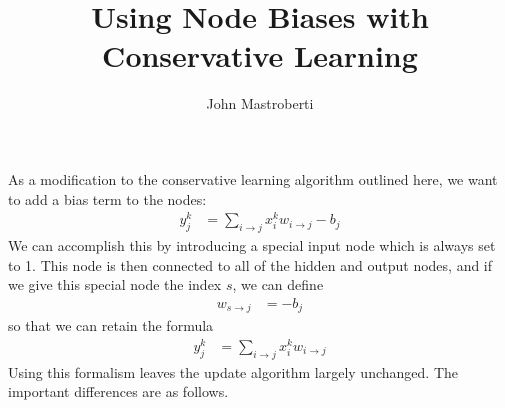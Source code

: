 \documentclass[12pt]{article}
\begin{document}
\title{Using Node Biases with Conservative Learning}
\author{John Mastroberti}
 
\maketitle

As a modification to the conservative learning algorithm outlined here\cite{cl_update}, we want to add a bias term to the nodes:
\begin{align}
y_j^k & = \sum_{i \rightarrow j} x_i^k w_{i \rightarrow j} - b_j
\end{align}
We can accomplish this by introducing a special input node which is always set to 1.
This node is then connected to all of the hidden and output nodes, 
and if we give this special node the index $s$, we can define
\begin{align}
w_{s \rightarrow j} & = -b_j
\end{align}
so that we can retain the formula 
\begin{align}
y_j^k & = \sum_{i \rightarrow j} x_i^k w_{i \rightarrow j}
\end{align}
Using this formalism leaves the update algorithm largely unchanged.
The important differences are as follows.
\end{document}
